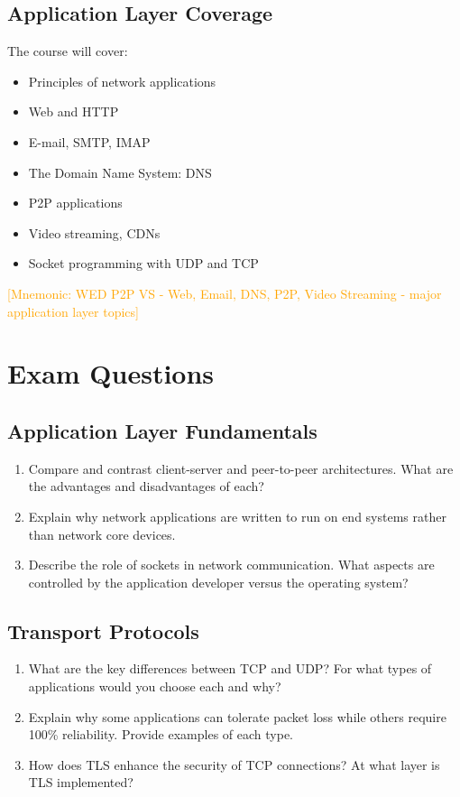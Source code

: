 \documentclass[12pt]{article}
\begin{document}
\subsection{Application Layer Coverage}
The course will cover:
\begin{itemize}
    \item Principles of network applications
    \item Web and HTTP
    \item E-mail, SMTP, IMAP
    \item The Domain Name System: DNS
    \item P2P applications
    \item Video streaming, CDNs
    \item Socket programming with UDP and TCP
\end{itemize}

\textcolor{orange}{[Mnemonic: WED P2P VS - Web, Email, DNS, P2P, Video Streaming - major application layer topics]}

\section{Exam Questions}

\subsection*{Application Layer Fundamentals}
\begin{enumerate}
    \item Compare and contrast client-server and peer-to-peer architectures. What are the advantages and disadvantages of each?
    \item Explain why network applications are written to run on end systems rather than network core devices.
    \item Describe the role of sockets in network communication. What aspects are controlled by the application developer versus the operating system?
\end{enumerate}

\subsection*{Transport Protocols}
\begin{enumerate}
    \item What are the key differences between TCP and UDP? For what types of applications would you choose each and why?
    \item Explain why some applications can tolerate packet loss while others require 100\% reliability. Provide examples of each type.
    \item How does TLS enhance the security of TCP connections? At what layer is TLS implemented?
\end{enumerate}
\end{document}
